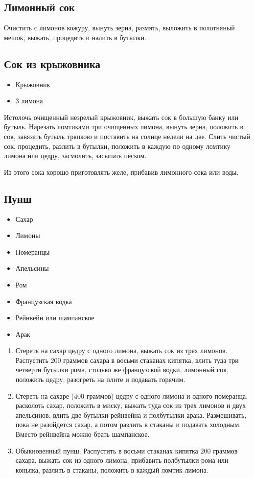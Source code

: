 \subsection{Лимонный сок}

Очистить с лимонов кожуру, вынуть зерна, размять, выложить в полотняный мешок, выжать, процедить и налить в бутылки.

\subsection{Сок из крыжовника}

\begin{itemize}
	\item Крыжовник 
    \item 3 лимона
\end{itemize}

Истолочь очищенный незрелый крыжовник, выжать сок в большую банку или бутыль. Нарезать ломтиками три очищенных лимона, вынуть зерна, положить в сок, завязать бутыль тряпкою и поставить на солнце недели на две. Слить чистый сок, процедить, разлить в бутылки, положить в каждую по одному ломтику лимона или цедру, засмолить, засыпать песком.

Из этого сока хорошо приготовлять желе, прибавив лимонного сока или воды.

\subsection{Пунш}

\begin{itemize}
	\item Сахар 
    \item Лимоны 
    \item Померанцы 
    \item Апельсины
    \item Ром
    \item Французская водка 
    \item Рейнвейн или шампанское 
    \item Арак
\end{itemize}

\begin{enumerate}
	\item Стереть на сахар цедру с одного лимона, выжать сок из трех лимонов. Распустить 200 граммов сахара в восьми стаканах кипятка, влить туда три четверти бутылки рома, столько же французской водки, лимонный сок, положить цедру, разогреть на плите и подавать горячим.
	\item Стереть на сахаре (400 граммов) цедру с одного лимона и одного померанца, расколоть сахар, положить в миску, выжать туда сок из трех лимонов и двух апельсинов, влить две бутылки рейнвейна и полбутылки арака. Размешивать, пока не разойдется сахар, а потом разлить в стаканы и подавать холодным. Вместо рейнвейна можно брать шампанское.
	\item Обыкновенный пунш. Распустить в восьми стаканах кипятка 200 граммов сахара, выжать сок из одного лимона, прибавить полбутылки рома или коньяка, разлить в стаканы, положить в каждый ломтик лимона.
\end{enumerate} 

